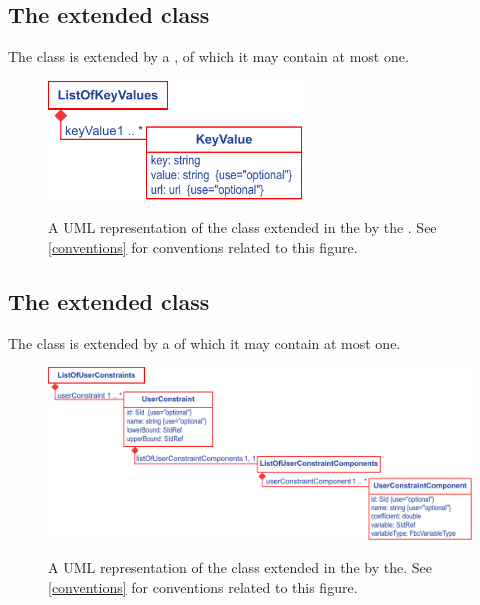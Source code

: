 \subsection{The extended  class}
\label{sbase-class-kv}

The \SBML \SBase class is extended by a , of which it may contain at most one.
%
\begin{figure}[ht]
  \centering
  \includegraphics[width=0.6\textwidth]{images/fbc_v3_uml_keyvalue.pdf}\\
  \caption{A UML representation of the \SBML \SBase class extended in
  the \FBCPackage by the \ListOfKeyValues. See \ref{conventions} for conventions related to this
  figure.}
  \label{fig:fbc_v3_uml_keyvalue}
\end{figure}


\subsection{The extended  class}
\label{model-class-kv}

The \SBML \Model class is extended by a  of which it may contain at most one.
%
\begin{figure}[ht]
  \centering
  \includegraphics[width=\textwidth]{images/fbc_v3_uml_userconstraint.pdf}\\
  \caption{A UML representation of the \SBML \Model class extended in
  the \FBCPackage by the\ListOfUserConstraints. See \ref{conventions} for conventions related to this
  figure.}
  \label{fig:fbc_v3_uml_user_constraints}
\end{figure}

